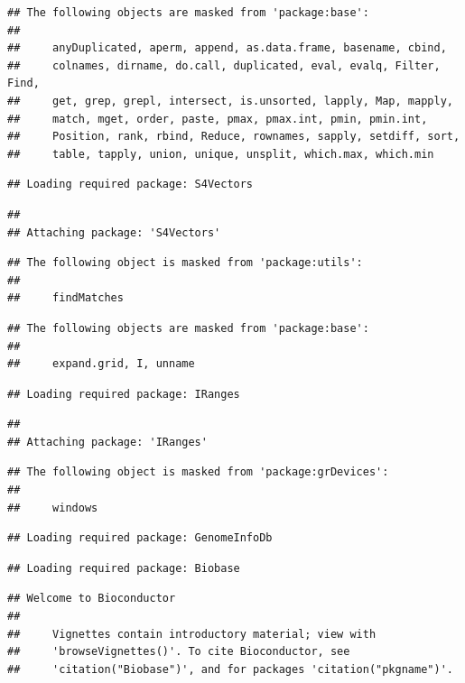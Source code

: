 \documentclass[
]{article}
\begin{document}
\begin{verbatim}
## The following objects are masked from 'package:base':
## 
##     anyDuplicated, aperm, append, as.data.frame, basename, cbind,
##     colnames, dirname, do.call, duplicated, eval, evalq, Filter, Find,
##     get, grep, grepl, intersect, is.unsorted, lapply, Map, mapply,
##     match, mget, order, paste, pmax, pmax.int, pmin, pmin.int,
##     Position, rank, rbind, Reduce, rownames, sapply, setdiff, sort,
##     table, tapply, union, unique, unsplit, which.max, which.min
\end{verbatim}

\begin{verbatim}
## Loading required package: S4Vectors
\end{verbatim}

\begin{verbatim}
## 
## Attaching package: 'S4Vectors'
\end{verbatim}

\begin{verbatim}
## The following object is masked from 'package:utils':
## 
##     findMatches
\end{verbatim}

\begin{verbatim}
## The following objects are masked from 'package:base':
## 
##     expand.grid, I, unname
\end{verbatim}

\begin{verbatim}
## Loading required package: IRanges
\end{verbatim}

\begin{verbatim}
## 
## Attaching package: 'IRanges'
\end{verbatim}

\begin{verbatim}
## The following object is masked from 'package:grDevices':
## 
##     windows
\end{verbatim}

\begin{verbatim}
## Loading required package: GenomeInfoDb
\end{verbatim}

\begin{verbatim}
## Loading required package: Biobase
\end{verbatim}

\begin{verbatim}
## Welcome to Bioconductor
## 
##     Vignettes contain introductory material; view with
##     'browseVignettes()'. To cite Bioconductor, see
##     'citation("Biobase")', and for packages 'citation("pkgname")'.
\end{verbatim}
\end{document}
